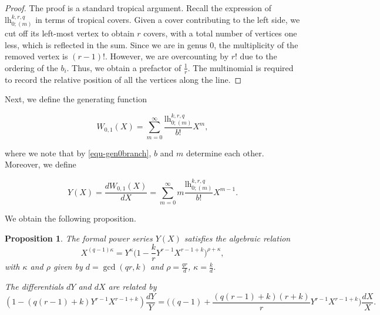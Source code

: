 \documentclass[10pt,a4paper,oneside,no-math,reqno]{amsart}%
\theoremstyle{plain}
\newtheorem{proposition}[theorem]{Proposition}
\theoremstyle{definition}
\theoremstyle{remark}
\numberwithin{equation}{section}
\newcommand{\1}{\mathds{1}}
\newcommand{\<}{\langle}
\renewcommand{\>}{\rangle}
\newcommand{\lh}{\mathord{\mathrm{l\!h}}}
\begin{document}
\begin{proof}
	The proof is a standard tropical argument. Recall the expression of $\lh^{k,r,q}_{0;(m)}$ in terms of tropical covers.  Given a cover contributing to the left side, we cut off its left-most vertex to obtain $r$ covers, with a total number of vertices one less, which is reflected in the sum. Since we are in genus $0$, the multiplicity of the removed vertex is $(r-1)!$. However, we are overcounting by $r!$ due to the ordering of the $b_i$. Thus, we obtain a prefactor of $\frac{1}{r}$. The multinomial is required to record the relative position of all the vertices along the line.
\end{proof}

Next, we define the generating function

\begin{equation}
    W_{0,1}(X)
    =
    \sum_{m=0}^\infty\frac{\lh^{k,r,q}_{0;(m)}}{b!}X^m,
\end{equation}

where we note that by \cref{equ-gen0branch}, $b$ and $m$ determine each other. Moreover, we define

\begin{equation}
    Y(X)=\frac{dW_{0,1}(X)}{dX}
    =
    \sum_{m=0}^\infty m\frac{\lh^{k,r,q}_{0;(m)}}{b!}X^{m-1}.
\end{equation}

We obtain the following proposition.

\begin{proposition}
\label{prop-01spectral}
	The formal power series $Y(X)$ satisfies the algebraic relation
	\begin{equation}\label{SpectralCurve}
		X^{(q-1) \kappa}
        =
        Y^\kappa \big( 1 - \frac{k}{r} Y^{r-1} X^{r-1+k} \big)^{\rho + \kappa} ,
	\end{equation}
	with $ \kappa $ and $ \rho$ given by $ d = \gcd (qr, k) $ and $ \rho = \frac{qr}{d}$, $ \kappa = \frac{k}{d}$.\par
	The differentials $ dY$ and $ dX$ are related by
	\begin{equation}\label{DiffEqFory}
		(1 - (q(r-1)+k)Y^{r-1} X^{r-1+k} ) \frac{dY}{Y}
        =
        \Big( (q-1) + \frac{(q(r-1)+k)(r+k)}{r} Y^{r-1} X^{r-1+k} \Big) \frac{dX}{X}.
	\end{equation}
\end{proposition}
\end{document}
